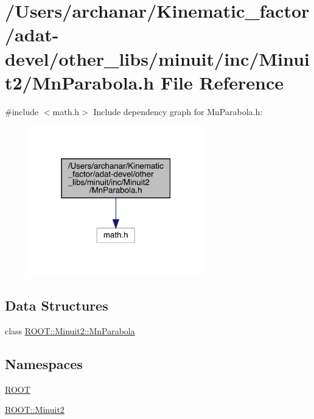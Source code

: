 \hypertarget{adat-devel_2other__libs_2minuit_2inc_2Minuit2_2MnParabola_8h}{}\section{/\+Users/archanar/\+Kinematic\+\_\+factor/adat-\/devel/other\+\_\+libs/minuit/inc/\+Minuit2/\+Mn\+Parabola.h File Reference}
\label{adat-devel_2other__libs_2minuit_2inc_2Minuit2_2MnParabola_8h}
{\ttfamily \#include $<$math.\+h$>$}\newline
Include dependency graph for Mn\+Parabola.\+h\+:
\nopagebreak
\begin{figure}[H]
\begin{center}
\leavevmode
\includegraphics[width=214pt]{d9/d96/adat-devel_2other__libs_2minuit_2inc_2Minuit2_2MnParabola_8h__incl}
\end{center}
\end{figure}
\subsection*{Data Structures}
\begin{DoxyCompactItemize}
\item 
class \mbox{\hyperlink{classROOT_1_1Minuit2_1_1MnParabola}{R\+O\+O\+T\+::\+Minuit2\+::\+Mn\+Parabola}}
\end{DoxyCompactItemize}
\subsection*{Namespaces}
\begin{DoxyCompactItemize}
\item 
 \mbox{\hyperlink{namespaceROOT}{R\+O\+OT}}
\item 
 \mbox{\hyperlink{namespaceROOT_1_1Minuit2}{R\+O\+O\+T\+::\+Minuit2}}
\end{DoxyCompactItemize}
